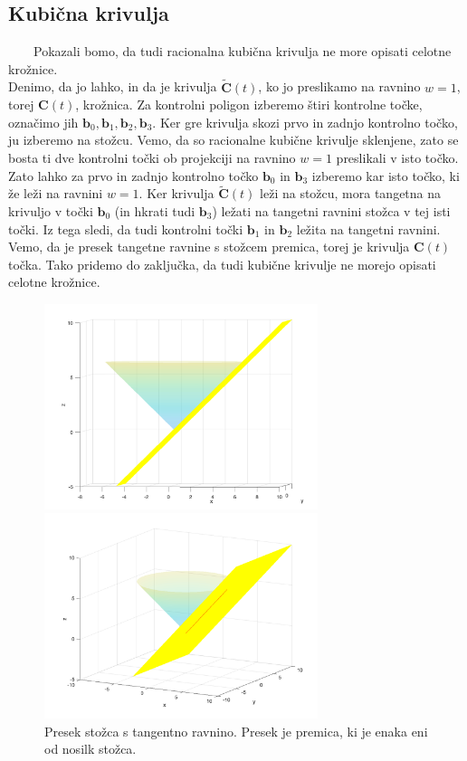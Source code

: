 \documentclass[a4paper,11pt]{article}
\theoremstyle{definition}
\theoremstyle{plain}
\begin{document}
\subsection{Kubična krivulja}
\ \ \ \
Pokazali bomo, da tudi racionalna kubična krivulja ne more opisati celotne krožnice. \\
Denimo, da jo lahko, in da je krivulja $\boldsymbol{\tilde{C}}(t)$, ko jo preslikamo na ravnino $w = 1$, torej $\boldsymbol{C}(t)$, krožnica.
Za kontrolni poligon izberemo štiri kontrolne točke, označimo jih $\boldsymbol{b}_0, \boldsymbol{b}_1, \boldsymbol{b}_2, \boldsymbol{b}_3$. Ker gre krivulja skozi prvo in zadnjo kontrolno točko, ju izberemo na stožcu.
Vemo, da so racionalne kubične krivulje sklenjene, zato se bosta ti dve kontrolni točki ob projekciji na ravnino $w = 1$ preslikali v isto točko. 
Zato lahko za prvo in zadnjo kontrolno točko $\boldsymbol{b}_0$ in $\boldsymbol{b}_3$ izberemo kar isto točko, ki že leži na ravnini $w = 1$. 
Ker krivulja $\boldsymbol{\tilde{C}}(t)$ leži na stožcu, mora tangetna na krivuljo v točki $\boldsymbol{b}_0$ (in hkrati tudi $\boldsymbol{b}_3$) ležati na tangetni ravnini stožca v tej isti točki.
Iz tega sledi, da tudi kontrolni točki $\boldsymbol{b}_1$ in $\boldsymbol{b}_2$ ležita na tangetni ravnini. Vemo, da je presek tangetne ravnine s stožcem premica, torej je krivulja $\boldsymbol{C}(t)$ točka.
Tako pridemo do zaključka, da tudi kubične krivulje ne morejo opisati celotne krožnice.
\begin{figure}[ht!]
    \begin{minipage}{0.5\textwidth}
        \centering
        \includegraphics[width=80mm]{stozec_tang_1.png}
    \end{minipage}\hfill
    \begin{minipage}{0.5\textwidth}
        \centering
        \includegraphics[width=80mm]{stozec_tang_2.png}
    \end{minipage}\hfill
    \caption{Presek stožca s tangentno ravnino. Presek je premica, ki je enaka eni od nosilk stožca.}
\end{figure}
\end{document}

